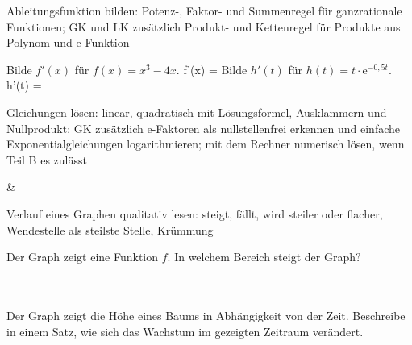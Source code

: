 \begin{aufgabe}{Ableitungsfunktion bilden: Potenz-, Faktor- und Summenregel für ganzrationale Funktionen; GK und LK zusätzlich Produkt- und Kettenregel für Produkte aus Polynom und e-Funktion}
\begin{teile}
\teil Bilde $f'(x)$ für $f(x) = x^3 - 4x$. f'(x) = \leerfeld
\teil Bilde $h'(t)$ für $h(t) = t \cdot \mathrm{e}^{-0{,}5t}$. h'(t) = \leerfeld
\end{teile}
\end{aufgabe}

\begin{aufgabe}{Gleichungen lösen: linear, quadratisch mit Lösungsformel, Ausklammern und Nullprodukt; GK zusätzlich e-Faktoren als nullstellenfrei erkennen und einfache Exponentialgleichungen logarithmieren; mit dem Rechner numerisch lösen, wenn Teil B es zulässt}
\begin{gleichungsraster}[2]
 &
 \\
\end{gleichungsraster}
\end{aufgabe}

\begin{aufgabe}{Verlauf eines Graphen qualitativ lesen: steigt, fällt, wird steiler oder flacher, Wendestelle als steilste Stelle, Krümmung}
\begin{teile}
\teil Der Graph zeigt eine Funktion $f$. In welchem Bereich steigt der Graph? \\  \\  \\ 

\begin{ksys}[xmin=-2,xmax=4,ymin=-2,ymax=6,ablesen]\end{ksys}
\teil Der Graph zeigt die Höhe eines Baums in Abhängigkeit von der Zeit. Beschreibe in einem Satz, wie sich das Wachstum im gezeigten Zeitraum verändert.

\begin{ksys}[xmin=0,xmax=8,ymin=0,ymax=8,xstep=1,ystep=1,xlabel=t in Jahren,ylabel=h in m,ablesen]\end{ksys}
\end{teile}
\end{aufgabe}

